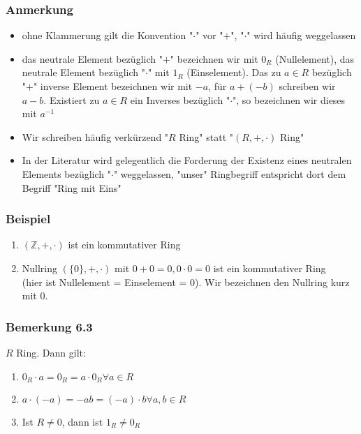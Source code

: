 \documentclass[a4paper]{scrartcl}
\DeclareMathOperator{\Forall}{\forall}
\theoremstyle{definition}
\theoremstyle{plain}
\theoremstyle{plain}
\theoremstyle{remark}
\theoremstyle{remark}
\theoremstyle{remark}
\theoremstyle{remark}
\theoremstyle{remark}
\begin{document}
\subsubsection{Anmerkung}
\label{sec-3-2-1}
\begin{itemize}
\item ohne Klammerung gilt die Konvention "$\cdot$" vor "$+$", "$\cdot$" wird häufig weggelassen
\item das neutrale Element bezüglich "$+$" bezeichnen wir mit $0_R$ (Nullelement), das neutrale Element bezüglich "$\cdot$" mit $1_R$ (Einselement).
Das zu $a\in R$ bezüglich "$+$" inverse Element bezeichnen wir mit $-a$,
für $a + (-b)$ schreiben wir $a - b$. Existiert zu $a\in R$ ein Inverses bezüglich "$\cdot$", so bezeichnen wir dieses mit $a^{-1}$
\item Wir schreiben häufig verkürzend "$R$ Ring" statt "$(R,+,\cdot)$ Ring"
\item In der Literatur wird gelegentlich die Forderung der Existenz eines neutralen Elements bezüglich "$\cdot$" weggelassen, "unser" Ringbegriff
entspricht dort dem Begriff "Ring mit Eins"
\end{itemize}
\subsubsection{Beispiel}
\label{sec-3-2-2}
\begin{enumerate}
\item $(\mathbb{Z},+,\cdot)$ ist ein kommutativer Ring
\item Nullring $(\{0\},+,\cdot)$ mit $0 + 0 = 0, 0\cdot 0 = 0$ ist ein kommutativer Ring \\
       (hier ist Nullelement = Einselement = 0). Wir bezeichnen den Nullring kurz mit $0$.
\end{enumerate}
\subsubsection{Bemerkung 6.3}
\label{sec-3-2-3}
$R$ Ring. Dann gilt:
\begin{enumerate}
\item $0_R\cdot a = 0_R = a\cdot 0_R\Forall a\in R$
\item $a\cdot (-a) = - a b = (-a) \cdot b \Forall a,b\in R$
\item Ist $R\neq 0$, dann ist $1_R\neq 0_R$
\end{enumerate}
\end{document}
